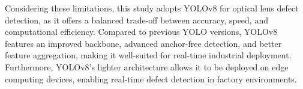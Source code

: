 Considering these limitations, this study adopts YOLOv8 for optical lens defect detection, as it offers a balanced trade-off between accuracy, speed, and computational efficiency. Compared to previous YOLO versions, YOLOv8 features an improved backbone, advanced anchor-free detection, and better feature aggregation, making it well-suited for real-time industrial deployment. Furthermore, YOLOv8’s lighter architecture allows it to be deployed on edge computing devices, enabling real-time defect detection in factory environments.
